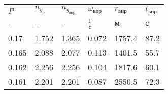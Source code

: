 \begin{tabular}{llllll}
$\bar{P}$ & $n_{y_{p}}$ & $n_{y_{вир}}$ & $\omega_{вир}$ & $r_{вир}$ & $t_{вир}$ \\
- & - & - & $\frac{1}{с}$ & $м$ & $с$ \\
0.17 & 1.752 & 1.365 & 0.072 & 1757.4 & 87.2 \\
0.165 & 2.088 & 2.077 & 0.113 & 1401.5 & 55.7 \\
0.162 & 2.256 & 2.256 & 0.104 & 1817.6 & 60.1 \\
0.161 & 2.201 & 2.201 & 0.087 & 2550.5 & 72.3 \\
\end{tabular}
